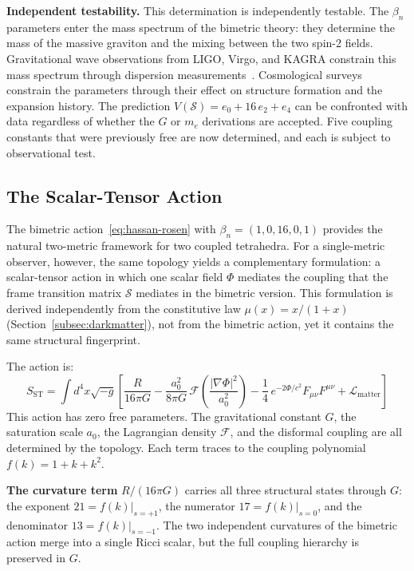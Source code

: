 \documentclass[aps,prd,preprint,superscriptaddress,showpacs,preprintnumbers,amsmath,amssymb,nofootinbib]{revtex4-2}
\begin{document}
\textbf{Independent testability.} This determination is independently testable. The $\beta_n$ parameters enter the mass spectrum of the bimetric theory: they determine the mass of the massive graviton and the mixing between the two spin-2 fields. Gravitational wave observations from LIGO, Virgo, and KAGRA constrain this mass spectrum through dispersion measurements~\cite{gw170817}. Cosmological surveys constrain the parameters through their effect on structure formation and the expansion history. The prediction $V(\mathcal{S}) = e_0 + 16\,e_2 + e_4$ can be confronted with data regardless of whether the $G$ or $m_e$ derivations are accepted. Five coupling constants that were previously free are now determined, and each is subject to observational test.

\subsection{The Scalar-Tensor Action}
\label{subsec:scalar-tensor}

The bimetric action~\eqref{eq:hassan-rosen} with $\beta_n = (1, 0, 16, 0, 1)$ provides the natural two-metric framework for two coupled tetrahedra. For a single-metric observer, however, the same topology yields a complementary formulation: a scalar-tensor action in which one scalar field $\Phi$ mediates the coupling that the frame transition matrix $\mathcal{S}$ mediates in the bimetric version. This formulation is derived independently from the constitutive law $\mu(x) = x/(1+x)$ (Section~\ref{subsec:darkmatter}), not from the bimetric action, yet it contains the same structural fingerprint.

The action is:
\begin{equation}
S_{\text{ST}} = \int d^4x \sqrt{-g} \left[ \frac{R}{16\pi G} - \frac{a_0^2}{8\pi G}\,\mathcal{F}\!\left(\frac{|\nabla\Phi|^2}{a_0^2}\right) - \frac{1}{4}\,e^{-2\Phi/c^2} F_{\mu\nu}F^{\mu\nu} + \mathcal{L}_{\text{matter}} \right]
\label{eq:scalar-tensor}
\end{equation}
This action has zero free parameters. The gravitational constant $G$, the saturation scale $a_0$, the Lagrangian density $\mathcal{F}$, and the disformal coupling are all determined by the topology. Each term traces to the coupling polynomial $f(k) = 1 + k + k^2$.

\textbf{The curvature term} $R/(16\pi G)$ carries all three structural states through $G$: the exponent $21 = f(k)|_{s=+1}$, the numerator $17 = f(k)|_{s=0}$, and the denominator $13 = f(k)|_{s=-1}$. The two independent curvatures of the bimetric action merge into a single Ricci scalar, but the full coupling hierarchy is preserved in $G$.
\end{document}

